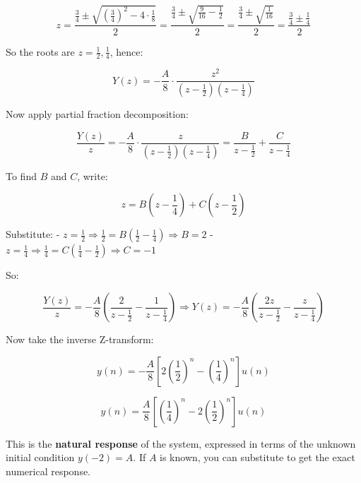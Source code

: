 \documentclass[12pt]{article}
\begin{document}
	\[
	z = \frac{\frac{3}{4} \pm \sqrt{\left(\frac{3}{4}\right)^2 - 4\cdot\frac{1}{8}}}{2}
	= \frac{\frac{3}{4} \pm \sqrt{\frac{9}{16} - \frac{1}{2}}}{2}
	= \frac{\frac{3}{4} \pm \sqrt{\frac{1}{16}}}{2}
	= \frac{\frac{3}{4} \pm \frac{1}{4}}{2}
	\]
	
	So the roots are \( z = \frac{1}{2}, \frac{1}{4} \), hence:
	
	\[
	Y(z) = -\frac{A}{8} \cdot \frac{z^2}{(z - \frac{1}{2})(z - \frac{1}{4})}
	\]
	
	Now apply partial fraction decomposition:
	
	\[
	\frac{Y(z)}{z} = -\frac{A}{8} \cdot \frac{z}{(z - \frac{1}{2})(z - \frac{1}{4})}
	= \frac{B}{z - \frac{1}{2}} + \frac{C}{z - \frac{1}{4}}
	\]
	
	To find \( B \) and \( C \), write:
	
	\[
	z = B\left(z - \frac{1}{4}\right) + C\left(z - \frac{1}{2}\right)
	\]
	
	Substitute:
	- \( z = \frac{1}{2} \Rightarrow \frac{1}{2} = B\left(\frac{1}{2} - \frac{1}{4}\right) \Rightarrow B = 2 \)
	- \( z = \frac{1}{4} \Rightarrow \frac{1}{4} = C\left(\frac{1}{4} - \frac{1}{2}\right) \Rightarrow C = -1 \)
	
	So:
	
	\[
	\frac{Y(z)}{z} = -\frac{A}{8} \left( \frac{2}{z - \frac{1}{2}} - \frac{1}{z - \frac{1}{4}} \right)
	\Rightarrow Y(z) = -\frac{A}{8} \left( \frac{2z}{z - \frac{1}{2}} - \frac{z}{z - \frac{1}{4}} \right)
	\]
	
	Now take the inverse Z-transform:
	
	\[
	y(n) = -\frac{A}{8} \left[ 2\left(\frac{1}{2}\right)^n - \left(\frac{1}{4}\right)^n \right] u(n)
	\]
	
	\[
	\boxed{
		y(n) = \frac{A}{8} \left[ \left(\frac{1}{4}\right)^n - 2\left(\frac{1}{2}\right)^n \right] u(n)
	}
	\]
	
	\bigskip
	
	\noindent This is the \textbf{natural response} of the system, expressed in terms of the unknown initial condition \( y(-2) = A \). If \( A \) is known, you can substitute to get the exact numerical response.
	
	
	
	
	

	
	
\end{document}
